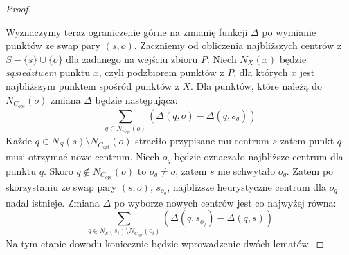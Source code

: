 \begin{proof}
\begin{figure}[H]
        \caption{}
    \end{figure}
    Wyznaczymy teraz ograniczenie górne na zmianię funkcji $\Delta$ po wymianie punktów ze swap pary $(s, o)$.
    Zaczniemy od obliczenia najbliższych centrów z $S - \{s\} \cup \{o\}$ dla zadanego na wejściu zbioru $P$.
    Niech $N_{X}(x)$ będzie \textit{sąsiedztwem} punktu $x$, czyli podzbiorem punktów z $P$, dla których $x$ jest najbliższym punktem spośród punktów z $X$. 
    Dla punktów, które należą do $N_{C_{opt}}(o)$ zmiana $\Delta$ będzie następująca:
    \begin{equation}
        \sum_{q \in N_{C_{opt}}(o)} (\Delta(q, o) - \Delta(q, s_{q}))
    \end{equation}
    Każde $q \in N_{S}(s) \setminus N_{C_{opt}}(o)$ straciło przypisane mu centrum $s$ zatem punkt $q$ musi otrzymać nowe centrum.
    Niech $o_{q}$ będzie oznaczało najbliższe centrum dla punktu $q$.
    Skoro $q \notin N_{C_{opt}}(o)$ to $o_{q} \neq o$, zatem $s$ nie schwytało $o_{q}$.
    Zatem po skorzystaniu ze swap pary $(s,o)$, $s_{o_{q}}$, najbliższe heurystyczne centrum dla $o_{q}$ nadal istnieje.
    Zmiana $\Delta$ po wyborze nowych centrów jest co najwyżej równa:
    \begin{equation}
        \sum_{q \in N_{S}(s_{i}) \setminus N_{C_{opt}}(o_{i})} (\Delta(q, s_{o_{q}}) - \Delta(q, s))
    \end{equation}
    Na tym etapie dowodu koniecznie będzie wprowadzenie dwóch lematów.
    

\end{proof}
